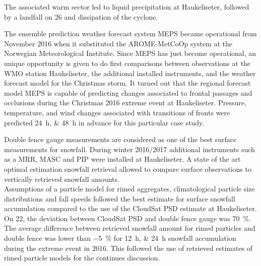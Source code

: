 The associated warm sector led to liquid precipitation at Haukeliseter, followed by a landfall on \SI{26}{\dec} and dissipation of the cyclone.
\par\medskip
\noindent
The ensemble prediction weather forecast system MEPS became operational from
November 2016 when it substituted the AROME-MetCoOp system at the Norwegian Meteorological Institute. 
Since MEPS has just become operational, an unique opportunity is given to do first comparisons between observations at the WMO station Haukeliseter, the additional installed instruments, and the weather forecast model for the Christmas storm.
It turned out that the regional forecast model MEPS is capable of predicting changes associated to frontal passages and occlusions during the Christmas 2016 extreme event at Haukeliseter. 
Pressure, temperature, and wind changes associated with transitions of fronts were predicted \SIlist{24;48}{\hour} in advance for this particular case study. 
\par\medskip
\noindent
Double fence gauge measurements are considered as one of the best surface measurements for snowfall. During winter 2016/2017 additional instruments such as a MRR, MASC and PIP were installed at Haukeliseter. A state of the art optimal estimation snowfall retrieval allowed to compare surface observations to vertically retrieved snowfall amounts. 
\\
Assumptions of a particle model for rimed aggregates, climatological particle size distributions and fall speeds followed the best estimate for surface snowfall accumulation compared to the use of the CloudSat PSD estimate at Haukeliseter. On \SI{22}{\dec}, the deviation between CloudSat PSD and double fence gauge was \SI{70}{\percent}. The average difference between retrieved snowfall amount for rimed particles and double fence was lower than \SI{-5}{\percent} for \SIlist{12;24}{\hour} snowfall accumulation during the extreme event in 2016. This followed the use of retrieved estimates of rimed particle models for the continues discussion.
